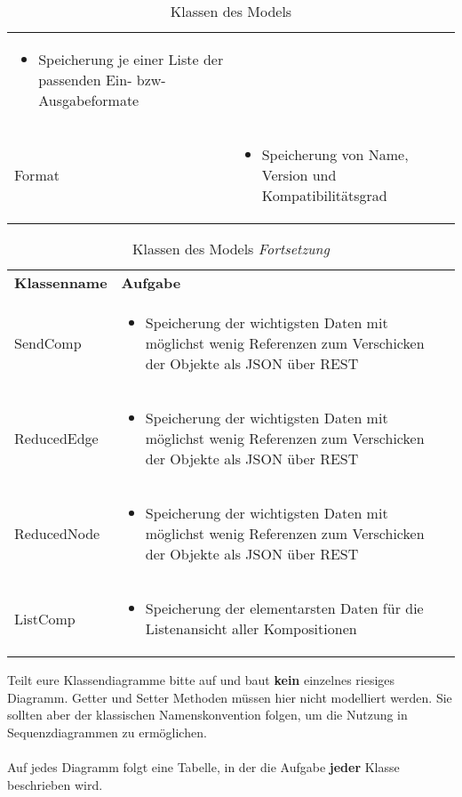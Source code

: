 \begin{table}[h]
\begin{tabularx}{\textwidth}{X X}
\begin{itemize}
			\item Speicherung je einer Liste der passenden Ein- bzw- Ausgabeformate 
		\end{itemize} \\
		\rowcolor[HTML]{E7E7E7} 
		Format & \begin{itemize}
			\item Speicherung von Name, Version und Kompatibilitätsgrad
		\end{itemize} \\
	\end{tabularx}
	\caption{Klassen des Models}
	\label{table:klassenbeschreibung-a}
\end{table}

\begin{table}
	\begin{tabularx}{\textwidth}{X X}
		\rowcolor[HTML]{C0C0C0} 
		\textbf{Klassenname} & \textbf{Aufgabe} \\
		SendComp & \begin{itemize}
			\item Speicherung der wichtigsten Daten mit möglichst wenig Referenzen zum Verschicken der Objekte als JSON über REST
		\end{itemize}\\
		\rowcolor[HTML]{E7E7E7}
		ReducedEdge & \begin{itemize}
			\item Speicherung der wichtigsten Daten mit möglichst wenig Referenzen zum Verschicken der Objekte als JSON über REST
		\end{itemize}\\
		ReducedNode & \begin{itemize}
			\item Speicherung der wichtigsten Daten mit möglichst wenig Referenzen zum Verschicken der Objekte als JSON über REST
		\end{itemize}\\
		\rowcolor[HTML]{E7E7E7}
		ListComp & \begin{itemize}
			\item Speicherung der elementarsten Daten für die Listenansicht aller Kompositionen
		\end{itemize}\\
	\end{tabularx}
	\caption{Klassen des Models \textit{Fortsetzung}}
\end{table}

\begin{tcolorbox}
Teilt eure Klassendiagramme bitte auf und baut \textbf{kein} einzelnes riesiges Diagramm.
Getter und Setter Methoden müssen hier nicht modelliert werden.
Sie sollten aber der klassischen Namenskonvention folgen, um die Nutzung in Sequenzdiagrammen zu ermöglichen.
\\\\
Auf jedes Diagramm folgt eine Tabelle, in der die Aufgabe \textbf{jeder} Klasse beschrieben wird.
\end{tcolorbox}
